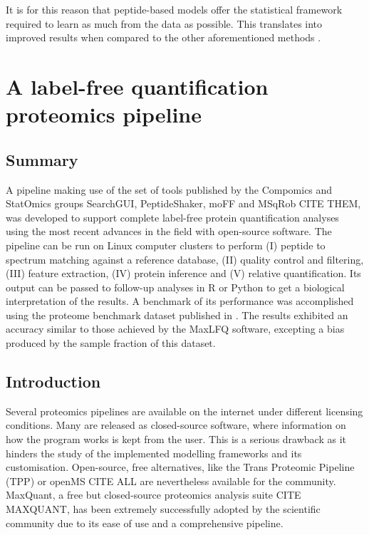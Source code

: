 \documentclass[11pt, a4paper]{report}
\begin{document}
It is for this reason that peptide-based models offer the statistical framework required to learn as much from the data as possible. This translates into improved results when compared to the other aforementioned methods \cite{Goeminne2015}.
%


\chapter{A label-free quantification proteomics pipeline}
\label{chap:pipeline}


\section*{Summary}
A pipeline making use of the set of tools published by the Compomics  and StatOmics groups SearchGUI, PeptideShaker, moFF and MSqRob CITE THEM, was developed to support complete label-free protein quantification analyses using the most recent advances in the field with open-source software. The pipeline can be run on Linux computer clusters to perform (I) peptide to spectrum matching against a reference database, (II) quality control and filtering, (III) feature extraction, (IV) protein inference and (V) relative quantification. Its output can be passed to follow-up analyses in R or Python to get a biological interpretation of the results.  A benchmark of its performance was accomplished using the proteome benchmark dataset published in \cite{Cox2014}. The results exhibited an accuracy similar to those achieved by the MaxLFQ \cite{Cox2014} software, excepting a bias produced by the sample fraction of this dataset.


\section{Introduction}

Several proteomics pipelines are available on the internet under different licensing conditions. Many are released as closed-source software, where information on how the program works is kept from the user. This is a serious drawback as it hinders the study of the implemented modelling frameworks and its customisation. Open-source, free alternatives, like the Trans Proteomic Pipeline (\ac{TPP}) or openMS  CITE ALL are nevertheless available for the community. MaxQuant, a free but closed-source proteomics analysis suite CITE MAXQUANT, has been extremely successfully adopted by the scientific community due to its ease of use and a comprehensive pipeline.
\end{document}
